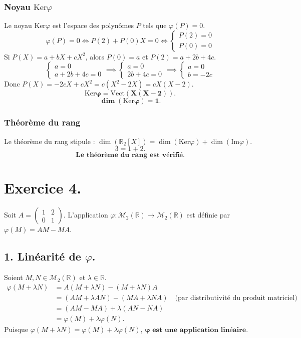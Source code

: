 \documentclass[french]{yLectureNote}
\begin{document}
\subsubsection*{Noyau $\mathrm{Ker}\varphi$}
Le noyau $\mathrm{Ker}\varphi$ est l'espace des polynômes $P$ tels que $\varphi(P) = 0$.
$$\varphi(P) = 0 \iff P(2) + P(0)X = 0 \iff \begin{cases} P(2) = 0 \\ P(0) = 0 \end{cases}$$
Si $P(X) = a+bX+cX^2$, alors $P(0)=a$ et $P(2)=a+2b+4c$.
$$\begin{cases} a = 0 \\ a+2b+4c = 0 \end{cases} \implies \begin{cases} a = 0 \\ 2b+4c = 0 \end{cases} \implies \begin{cases} a = 0 \\ b = -2c \end{cases}$$
Donc $P(X) = -2cX + cX^2 = c(X^2-2X) = cX(X-2)$.
$$\mathbf{\mathrm{Ker}\varphi = \mathrm{Vect}(X(X-2))}.$$
$$\mathbf{\dim(\mathrm{Ker}\varphi) = 1}.$$

\subsubsection*{Théorème du rang}
Le théorème du rang stipule : $\dim(\mathbb{R}_2[X]) = \dim(\mathrm{Ker}\varphi) + \dim(\mathrm{Im}\varphi)$.
$$3 = 1 + 2.$$
$$\mathbf{\text{Le théorème du rang est vérifié.}}$$

\section*{Exercice 4.}
Soit $A = \begin{pmatrix} 1 & 2 \\ 0 & 1 \end{pmatrix}$. L'application $\varphi: \mathcal{M}_2(\mathbb{R}) \to \mathcal{M}_2(\mathbb{R})$ est définie par $\varphi(M) = AM - MA$.

\subsection*{1. Linéarité de $\varphi$.}
Soient $M, N \in \mathcal{M}_2(\mathbb{R})$ et $\lambda \in \mathbb{R}$.
\begin{align*} \varphi(M + \lambda N) &= A(M + \lambda N) - (M + \lambda N)A \\ &= (AM + \lambda AN) - (MA + \lambda NA) \quad \text{(par distributivité du produit matriciel)} \\ &= (AM - MA) + \lambda (AN - NA) \\ &= \varphi(M) + \lambda \varphi(N). \end{align*}
Puisque $\varphi(M+\lambda N) = \varphi(M) + \lambda \varphi(N)$, $\mathbf{\varphi \text{ est une application linéaire}}$.
\end{document}
